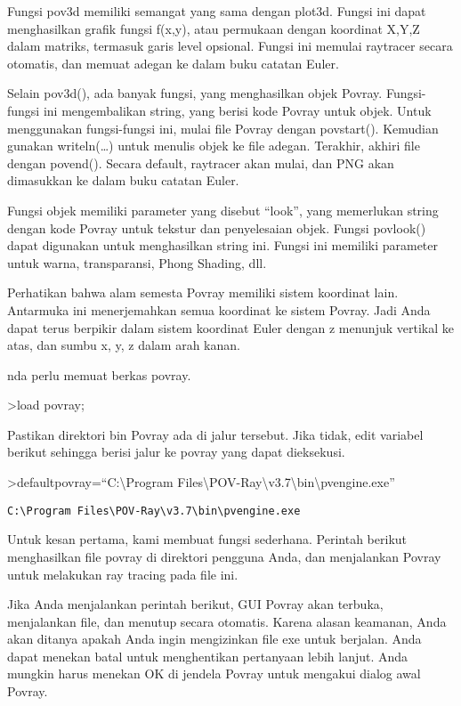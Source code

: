 \documentclass[
]{book}
\begin{document}
Fungsi pov3d memiliki semangat yang sama dengan plot3d. Fungsi ini dapat menghasilkan grafik fungsi f(x,y), atau permukaan dengan koordinat X,Y,Z dalam matriks, termasuk garis level opsional. Fungsi ini memulai raytracer secara otomatis, dan memuat adegan ke dalam buku catatan Euler.

Selain pov3d(), ada banyak fungsi, yang menghasilkan objek Povray. Fungsi-fungsi ini mengembalikan string, yang berisi kode Povray untuk objek. Untuk menggunakan fungsi-fungsi ini, mulai file Povray dengan povstart(). Kemudian gunakan writeln(\ldots) untuk menulis objek ke file adegan. Terakhir, akhiri file dengan povend(). Secara default, raytracer akan mulai, dan PNG akan dimasukkan ke dalam buku catatan Euler.

Fungsi objek memiliki parameter yang disebut ``look'', yang memerlukan string dengan kode Povray untuk tekstur dan penyelesaian objek. Fungsi povlook() dapat digunakan untuk menghasilkan string ini. Fungsi ini memiliki parameter untuk warna, transparansi, Phong Shading, dll.

Perhatikan bahwa alam semesta Povray memiliki sistem koordinat lain. Antarmuka ini menerjemahkan semua koordinat ke sistem Povray. Jadi Anda dapat terus berpikir dalam sistem koordinat Euler dengan z menunjuk vertikal ke atas, dan sumbu x, y, z dalam arah kanan.

nda perlu memuat berkas povray.

\textgreater load povray;

Pastikan direktori bin Povray ada di jalur tersebut. Jika tidak, edit variabel berikut sehingga berisi jalur ke povray yang dapat dieksekusi.

\textgreater defaultpovray=``C:\textbackslash Program Files\textbackslash POV-Ray\textbackslash v3.7\textbackslash bin\textbackslash pvengine.exe''

\begin{verbatim}
C:\Program Files\POV-Ray\v3.7\bin\pvengine.exe
\end{verbatim}

Untuk kesan pertama, kami membuat fungsi sederhana. Perintah berikut menghasilkan file povray di direktori pengguna Anda, dan menjalankan Povray untuk melakukan ray tracing pada file ini.

Jika Anda menjalankan perintah berikut, GUI Povray akan terbuka, menjalankan file, dan menutup secara otomatis. Karena alasan keamanan, Anda akan ditanya apakah Anda ingin mengizinkan file exe untuk berjalan. Anda dapat menekan batal untuk menghentikan pertanyaan lebih lanjut. Anda mungkin harus menekan OK di jendela Povray untuk mengakui dialog awal Povray.
\end{document}
